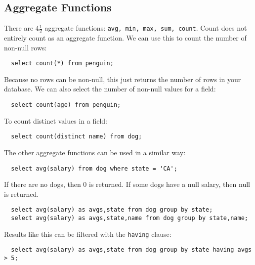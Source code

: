 \documentclass{math}
\begin{document}
\subsection*{Aggregate Functions}
There are \( 4\frac{1}{2} \) aggregate functions: \texttt{avg, min, max, sum,
count}. Count does not entirely count as an aggregate function. We can use
this to count the number of non-null rows:
\begin{lstlisting}
  select count(*) from penguin;
\end{lstlisting}
Because no rows can be non-null, this just returns the number of rows in your
database. We can also select the number of non-null values for a field:
\begin{lstlisting}
  select count(age) from penguin;
\end{lstlisting}
To count distinct values in a field:
\begin{lstlisting}
  select count(distinct name) from dog;
\end{lstlisting}
The other aggregate functions can be used in a similar way:
\begin{lstlisting}
  select avg(salary) from dog where state = 'CA';
\end{lstlisting}
If there are no dogs, then 0 is returned. If some dogs have a null salary, then
null is returned.
\begin{lstlisting}
  select avg(salary) as avgs,state from dog group by state;
  select avg(salary) as avgs,state,name from dog group by state,name;
\end{lstlisting}
Results like this can be filtered with the \texttt{having} clause:
\begin{lstlisting}
  select avg(salary) as avgs,state from dog group by state having avgs > 5;
\end{lstlisting}
\end{document}
